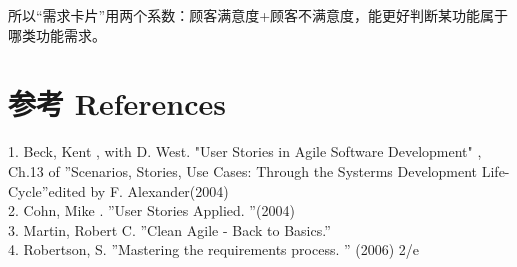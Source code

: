 所以``需求卡片''用两个系数：顾客满意度+顾客不满意度，能更好判断某功能属于哪类功能需求。

\hypertarget{ux9644ux4ef6}{%
\section{参考 References}\label{ux9644ux4ef6}}

1. Beck, Kent , with D. West. "User Stories in Agile Software Development" , Ch.13 of  ''Scenarios, Stories, Use Cases: Through the Systerms Development Life-Cycle''edited by F. Alexander(2004)\\
2. Cohn, Mike . ''User Stories Applied.  ''(2004)\\
3. Martin, Robert C. ''Clean Agile - Back to Basics.''\\
4. Robertson, S.  ''Mastering the requirements process. '' (2006) 2/e\\



